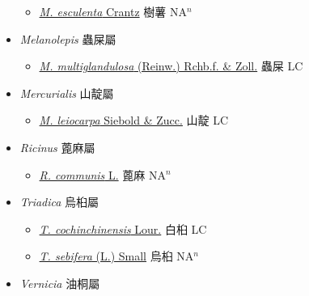 \begin{itemize}
  \begin{itemize}
        \item[] \href{http://www.theplantlist.org/tpl1.1/search?q=Manihot+esculenta}{\textit{M. esculenta} Crantz}   樹薯 NA$^n$
  \end{itemize}
 \item[] \textit{Melanolepis} 蟲屎屬
                    
  \begin{itemize}
        \item[] \href{http://www.theplantlist.org/tpl1.1/search?q=Melanolepis+multiglandulosa}{\textit{M. multiglandulosa} (Reinw.) Rchb.f. \& Zoll.}   蟲屎 LC
  \end{itemize}
 \item[] \textit{Mercurialis} 山靛屬
                    
  \begin{itemize}
        \item[] \href{http://www.theplantlist.org/tpl1.1/search?q=Mercurialis+leiocarpa}{\textit{M. leiocarpa} Siebold \& Zucc.}   山靛 LC
  \end{itemize}
 \item[] \textit{Ricinus} 蓖麻屬
                    
  \begin{itemize}
        \item[] \href{http://www.theplantlist.org/tpl1.1/search?q=Ricinus+communis}{\textit{R. communis} L.}   蓖麻 NA$^n$
  \end{itemize}
 \item[] \textit{Triadica} 烏桕屬
                    
  \begin{itemize}
        \item[] \href{http://www.theplantlist.org/tpl1.1/search?q=Triadica+cochinchinensis}{\textit{T. cochinchinensis} Lour.}     白桕 LC
        \item[] \href{http://www.theplantlist.org/tpl1.1/search?q=Triadica+sebifera}{\textit{T. sebifera} (L.) Small}     烏桕 NA$^n$
  \end{itemize}
 \item[] \textit{Vernicia} 油桐屬
                    

\end{itemize}
